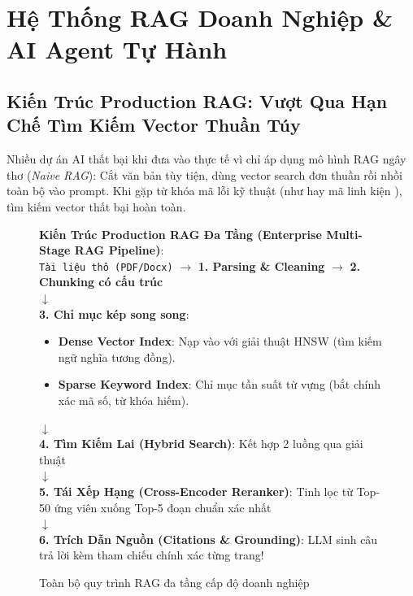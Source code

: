 
\chapter{Hệ Thống RAG Doanh Nghiệp \& AI Agent Tự Hành}
\label{ch:phase4-rag-agent}

\section{Kiến Trúc Production RAG: Vượt Qua Hạn Chế Tìm Kiếm Vector Thuần Túy}
\label{sec:rag-architecture}

Nhiều dự án AI thất bại khi đưa vào thực tế vì chỉ áp dụng mô hình RAG ngây thơ (\textit{Naive RAG}): Cắt văn bản tùy tiện, dùng vector search đơn thuần rồi nhồi toàn bộ vào prompt. Khi gặp từ khóa mã lỗi kỹ thuật (như  hay mã linh kiện ), tìm kiếm vector thất bại hoàn toàn.

\begin{figure}[htbp]
\centering
\begin{tcolorbox}[colback=boxbg,colframe=primarycolor,width=0.95\textwidth,arc=2pt]
\small
\textbf{Kiến Trúc Production RAG Đa Tầng (Enterprise Multi-Stage RAG Pipeline)}:\\[0.2cm]
\texttt{Tài liệu thô (PDF/Docx)} $\longrightarrow$ \textbf{1. Parsing \& Cleaning} $\longrightarrow$ \textbf{2. Chunking có cấu trúc}\\
$\downarrow$\\
\textbf{3. Chỉ mục kép song song}:
\begin{itemize}
  \item \textbf{Dense Vector Index}: Nạp vào  với giải thuật HNSW (tìm kiếm ngữ nghĩa tương đồng).
  \item \textbf{Sparse Keyword Index}: Chỉ mục tần suất từ vựng  (bắt chính xác mã số, từ khóa hiếm).
\end{itemize}
$\downarrow$\\
\textbf{4. Tìm Kiếm Lai (Hybrid Search)}: Kết hợp 2 luồng qua giải thuật \\
$\downarrow$\\
\textbf{5. Tái Xếp Hạng (Cross-Encoder Reranker)}: Tinh lọc từ Top-50 ứng viên xuống Top-5 đoạn chuẩn xác nhất\\
$\downarrow$\\
\textbf{6. Trích Dẫn Nguồn (Citations \& Grounding)}: LLM sinh câu trả lời kèm tham chiếu chính xác từng trang!
\end{tcolorbox}
\caption{Toàn bộ quy trình RAG đa tầng cấp độ doanh nghiệp}
\label{fig:production-rag-pipeline}
\end{figure}

